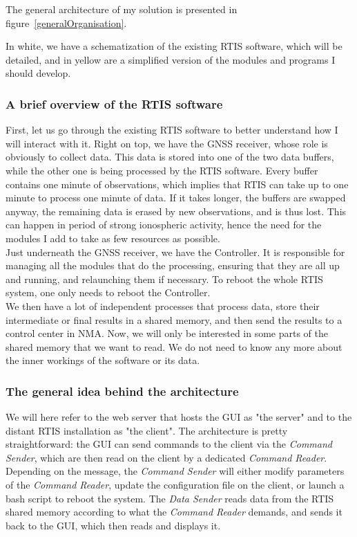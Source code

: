 \documentclass{themeensg}
\begin{document}
The general architecture of my solution is presented in figure~\ref{generalOrganisation}.

In white, we have a schematization of the existing RTIS software, which will be detailed, and in yellow are a simplified version of the modules and programs I should develop.

\subsubsection{A brief overview of the RTIS software}

First, let us go through the existing RTIS software to better understand how I will interact with it. Right on top, we have the GNSS receiver, whose role is obviously to collect data. This data is stored into one of the two data buffers, while the other one is being processed by the RTIS software. Every buffer contains one minute of observations, which implies that RTIS can take up to one minute to process one minute of data. If it takes longer, the buffers are swapped anyway, the remaining data is erased by new observations, and is thus lost. This can happen in period of strong ionospheric activity, hence the need for the modules I add to take as few resources as possible.\\

Just underneath the GNSS receiver, we have the Controller. It is responsible for managing all the modules that do the processing, ensuring that they are all up and running, and relaunching them if necessary. To reboot the whole RTIS system, one only needs to reboot the Controller.\\

We then have a lot of independent processes that process data, store their intermediate or final results in a shared memory, and then send the results to a control center in NMA. Now, we will only be interested in some parts of the shared memory that we want to read. We do not need to know any more about the inner workings of the software or its data.

\subsubsection{The general idea behind the architecture}

We will here refer to the web server that hosts the GUI as "the server" and to the distant RTIS installation as "the client".
The architecture is pretty straightforward: the GUI can send commands to the client via the \textit{Command Sender}, which are then read on the client by a dedicated \textit{Command Reader}. Depending on the message, the \textit{Command Sender} will either modify parameters of the \textit{Command Reader}, update the configuration file on the client, or launch a bash script to reboot the system. The \textit{Data Sender} reads data from the RTIS shared memory according to what the \textit{Command Reader} demands, and sends it back to the GUI, which then reads and displays it.\\
\end{document}

